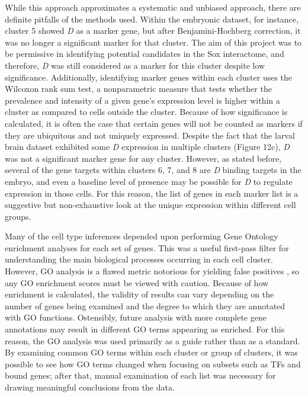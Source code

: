 \documentclass[withindex,glossary]{cam-thesis}
\begin{document}
While this approach approximates a systematic and unbiased approach,
there are definite pitfalls of the methods used. Within the embryonic
dataset, for instance, cluster 5 showed \emph{D} as a marker gene, but
after Benjamini-Hochberg correction, it was no longer a significant
marker for that cluster. The aim of this project was to be permissive in
identifying potential candidates in the Sox interactome, and therefore,
\emph{D} was still considered as a marker for this cluster despite low
significance. Additionally, identifying marker genes within each cluster
uses the Wilcoxon rank sum test, a nonparametric measure that tests
whether the prevalence and intensity of a given gene's expression level
is higher within a cluster as compared to cells outside the cluster.
Because of how significance is calculated, it is often the case that
certain genes will not be counted as markers if they are ubiquitous and
not uniquely expressed. Despite the fact that the larval brain dataset
exhibited some \emph{D} expression in multiple clusters (Figure 12c),
\emph{D} was not a significant marker gene for any cluster. However, as
stated before, several of the gene targets within clusters 6, 7, and 8
are \emph{D} binding targets in the embryo, and even a baseline level of
presence may be possible for \emph{D} to regulate expression in those
cells. For this reason, the list of genes in each marker list is a
suggestive but non-exhaustive look at the unique expression within
different cell groups.

Many of the cell type inferences depended upon performing Gene Ontology
enrichment analyses for each set of genes. This was a useful first-pass
filter for understanding the main biological processes occurring in each
cell cluster. However, GO analysis is a flawed metric notorious for
yielding false positives , so any GO enrichment
scores must be viewed with caution. Because of how enrichment is
calculated, the validity of results can vary depending on the number of
genes being examined and the degree to which they are annotated with GO
functions. Ostensibly, future analysis with more complete gene
annotations may result in different GO terms appearing as enriched. For
this reason, the GO analysis was used primarily as a guide rather than
as a standard. By examining common GO terms within each cluster or group
of clusters, it was possible to see how GO terms changed when focusing
on subsets such as TFs and bound genes; after that, manual examination
of each list was necessary for drawing meaningful conclusions from the
data.
\end{document}
